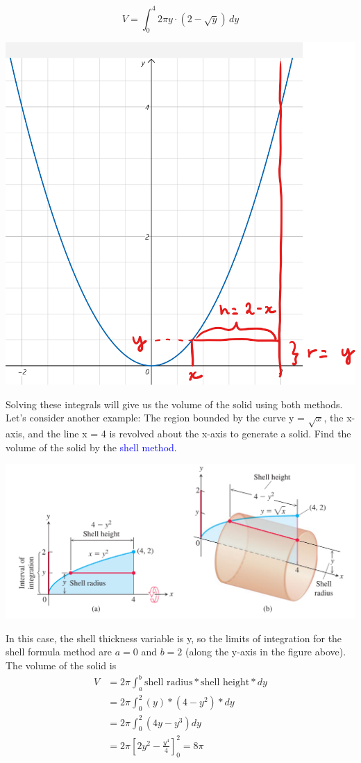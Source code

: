 \documentclass{article}
\begin{document}
\[
V = \int_{0}^{4} 2\pi y \cdot (2-\sqrt{y}) \, dy
\]
\begin{center}
    \includegraphics[scale = 0.7]{shell.png}
\end{center}
Solving these integrals will give us the volume of the solid using both methods.
\pagebreak
\\
Let's consider another example:
The region bounded by the curve y = $\sqrt{x}$, the x-axis, and the line x = 4 is revolved about the x-axis to generate a solid. Find the volume of the solid by the \textcolor{blue}{shell method}.
\begin{center}
    \includegraphics[scale = 0.35]{image_2023-12-18_215922175.png}
\end{center}
In this case, the shell thickness variable is y, so the limits of integration for the shell formula method are $a = 0$ and $b = 2$ (along the y-axis in the figure above). The volume of the solid is
\begin{align}
    V &= 2\pi \int_{a}^{b} \text{shell radius}*\text{shell height}*dy\\
    &= 2\pi \int_{0}^{2} (y)*(4-y^2)*dy\\
    &= 2\pi \int_{0}^{2} (4y-y^3)dy\\
    &= 2\pi \left[2y^2-\frac{y^4}{4}\right]_0^2 = 8\pi
\end{align}
\end{document}
